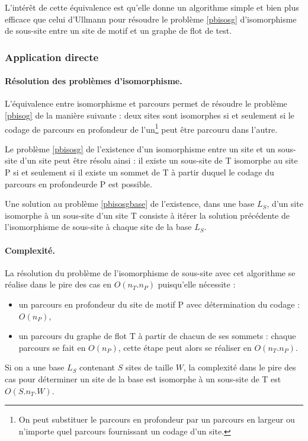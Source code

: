 L'intérêt de cette équivalence est qu'elle donne un algorithme simple et bien plus efficace que celui d'Ullmann pour résoudre le problème \ref{pbisosg} d'isomorphisme de sous-site entre un site de motif et un graphe de flot de test.


\subsubsection{Application directe}
\paragraph{Résolution des problèmes d'isomorphisme.}
L'équivalence entre isomorphisme et parcours permet de résoudre le problème \ref{pbisog} de la manière suivante :
deux sites sont isomorphes si et seulement si le codage de parcours en profondeur de l'un\footnote{On peut substituer le parcours en profondeur par un parcours en largeur ou n'importe quel parcours fournissant un codage d'un site.} peut être parcouru dans l'autre.

Le problème \ref{pbisosg} de l'existence d'un isomorphisme entre un site et un sous-site d'un site peut être résolu ainsi :
il existe un sous-site de T isomorphe au site P si et seulement si il existe un sommet de T à partir duquel le codage du parcours en profondeur\footnotemark[\value{footnote}] de P est possible.

Une solution au problème \ref{pbisosgbase} de l'existence, dans une base $L_S$, d'un site isomorphe à un sous-site d'un site T consiste à itérer la solution précédente de l'isomorphisme de sous-site à chaque site de la base $L_S$.

\paragraph{Complexité.}
La résolution du problème de l'isomorphisme de sous-site avec cet algorithme se réalise dans le pire des cas en $O(n_T.n_P)$ puisqu'elle nécessite :
\begin{itemize}
 \item un parcours en profondeur du site de motif P avec détermination du codage : $O(n_P)$,
 \item un parcours du graphe de flot T à partir de chacun de ses sommets : chaque parcours se fait en $O(n_P)$, cette étape peut alors se réaliser en $O(n_T.n_P)$.
 \end{itemize}
Si on a une base $L_S$ contenant $S$ sites de taille $W$, la complexité dans le pire des cas pour déterminer un site de la base est isomorphe à un sous-site de T est $O(S.n_T.W)$.


